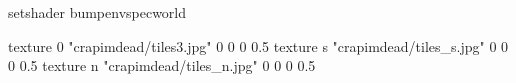 setshader bumpenvspecworld

texture 0 "crapimdead/tiles3.jpg" 0 0 0 0.5
texture s "crapimdead/tiles_s.jpg" 0 0 0 0.5
texture n "crapimdead/tiles_n.jpg" 0 0 0 0.5
